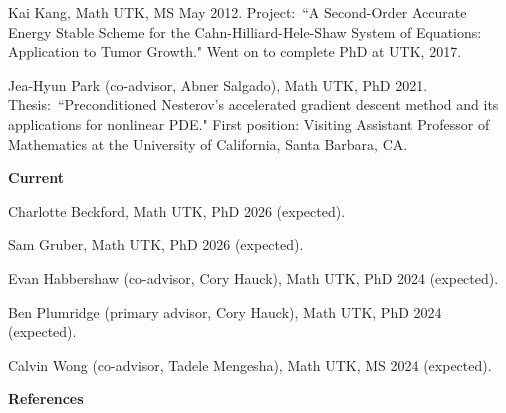 \documentclass[11pt]{letter}
\begin{document}
\begin{description}
\begin{description}
	\item
Kai Kang, Math UTK, MS May 2012.  Project:~``A Second-Order Accurate Energy Stable Scheme for the Cahn-Hilliard-Hele-Shaw System of Equations: Application to Tumor Growth." Went on to complete PhD at UTK, 2017.

	\item
Jea-Hyun Park (co-advisor, Abner Salgado), Math UTK, PhD 2021.  Thesis:~``Preconditioned Nesterov's accelerated gradient descent method and its applications for nonlinear PDE." First position: Visiting Assistant Professor of Mathematics at the University of California, Santa Barbara, CA.
	\end{description}
	\item
{\Large\bf Current}
	\begin{description}	
	\item
Charlotte Beckford, Math UTK, PhD 2026 (expected).
	\item
Sam Gruber, Math UTK, PhD 2026 (expected).
	\item
Evan Habbershaw (co-advisor, Cory Hauck), Math UTK, PhD 2024 (expected).
	\item
Ben Plumridge (primary advisor, Cory Hauck), Math UTK, PhD 2024 (expected).
	\item
Calvin Wong (co-advisor, Tadele Mengesha), Math UTK, MS 2024 (expected).
	\end{description}

	\end{description}

	\clearpage
	\newpage

{\LARGE\bf  References}
	
\end{document}
